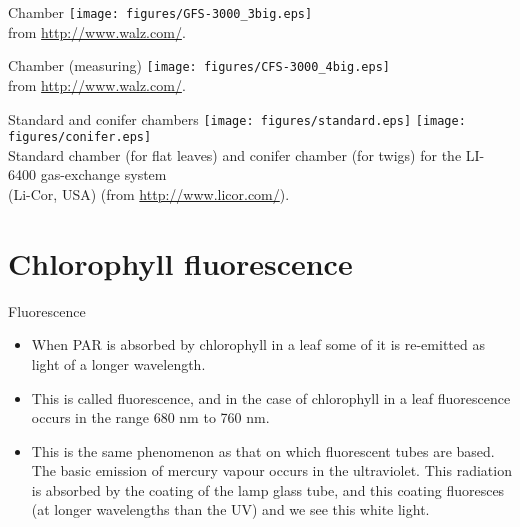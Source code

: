 \documentclass[10pt]{beamer}
\begin{document}
\begin{frame}{Chamber}
    \centering
    \texttt{[image: figures/GFS-3000\_3big.eps]}\\
    {\small from \url{http://www.walz.com/}.}
\end{frame}

\begin{frame}{Chamber (measuring)}
    \centering
    \texttt{[image: figures/CFS-3000\_4big.eps]}\\
    {\small from \url{http://www.walz.com/}.}
\end{frame}

\begin{frame}{Standard and conifer chambers}
    \centering
    \texttt{[image: figures/standard.eps]}%
    \texttt{[image: figures/conifer.eps]}\\
    {\small Standard chamber (for flat leaves) and conifer chamber (for twigs)
     for the LI-6400 gas-exchange system\\
     (Li-Cor, USA) (from \url{http://www.licor.com/}).}
\end{frame}

\section{Chlorophyll fluorescence}

\begin{frame}{Fluorescence}
    \begin{itemize}
        \item When PAR is absorbed by chlorophyll in a leaf some of
        it is re-emitted as light of a longer wavelength.
        \item This is called fluorescence, and in the case of
        chlorophyll in a leaf fluorescence occurs in the range 680
        nm to 760 nm.
        \item This is the same phenomenon as that on which
        fluorescent tubes are based. The basic emission of mercury
        vapour occurs in the ultraviolet. This radiation is absorbed
        by the coating of the lamp glass tube, and this coating
        fluoresces (at longer wavelengths than the UV)
        and we see this white light.
    \end{itemize}
\end{frame}
\end{document}
